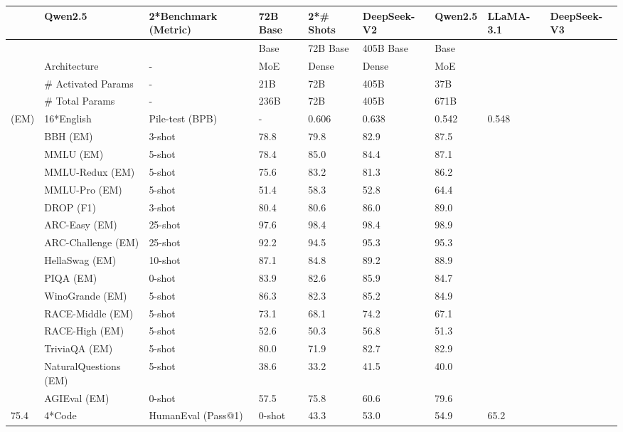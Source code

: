 \documentclass[11pt,a4paper]{article}
\begin{document}
\begin{table}[h]
\begin{tabular}{|l|l|l|l|l|l|l|l|l|}
\hline
 & Qwen2.5 & 2*Benchmark (Metric) & 72B Base & 2*\# Shots & DeepSeek-V2 & Qwen2.5 & LLaMA-3.1 & DeepSeek-V3 \\ \hline
 &  &  & Base & 72B Base & 405B Base & Base &  &  \\ \hline
 & Architecture & - & MoE & Dense & Dense & MoE &  &  \\ \hline
 & \# Activated Params & - & 21B & 72B & 405B & 37B &  &  \\ \hline
 & \# Total Params & - & 236B & 72B & 405B & 671B &  &  \\ \hline
(EM) & 16*English & Pile-test (BPB) & - & 0.606 & 0.638 & 0.542 & 0.548 &  \\ \hline
 & BBH (EM) & 3-shot & 78.8 & 79.8 & 82.9 & 87.5 &  &  \\ \hline
 & MMLU (EM) & 5-shot & 78.4 & 85.0 & 84.4 & 87.1 &  &  \\ \hline
 & MMLU-Redux (EM) & 5-shot & 75.6 & 83.2 & 81.3 & 86.2 &  &  \\ \hline
 & MMLU-Pro (EM) & 5-shot & 51.4 & 58.3 & 52.8 & 64.4 &  &  \\ \hline
 & DROP (F1) & 3-shot & 80.4 & 80.6 & 86.0 & 89.0 &  &  \\ \hline
 & ARC-Easy (EM) & 25-shot & 97.6 & 98.4 & 98.4 & 98.9 &  &  \\ \hline
 & ARC-Challenge (EM) & 25-shot & 92.2 & 94.5 & 95.3 & 95.3 &  &  \\ \hline
 & HellaSwag (EM) & 10-shot & 87.1 & 84.8 & 89.2 & 88.9 &  &  \\ \hline
 & PIQA (EM) & 0-shot & 83.9 & 82.6 & 85.9 & 84.7 &  &  \\ \hline
 & WinoGrande (EM) & 5-shot & 86.3 & 82.3 & 85.2 & 84.9 &  &  \\ \hline
 & RACE-Middle (EM) & 5-shot & 73.1 & 68.1 & 74.2 & 67.1 &  &  \\ \hline
 & RACE-High (EM) & 5-shot & 52.6 & 50.3 & 56.8 & 51.3 &  &  \\ \hline
 & TriviaQA (EM) & 5-shot & 80.0 & 71.9 & 82.7 & 82.9 &  &  \\ \hline
 & NaturalQuestions (EM) & 5-shot & 38.6 & 33.2 & 41.5 & 40.0 &  &  \\ \hline
 & AGIEval (EM) & 0-shot & 57.5 & 75.8 & 60.6 & 79.6 &  &  \\ \hline
75.4 & 4*Code & HumanEval (Pass@1) & 0-shot & 43.3 & 53.0 & 54.9 & 65.2 &  \\ \hline

\end{tabular}
\end{table}
\end{document}
